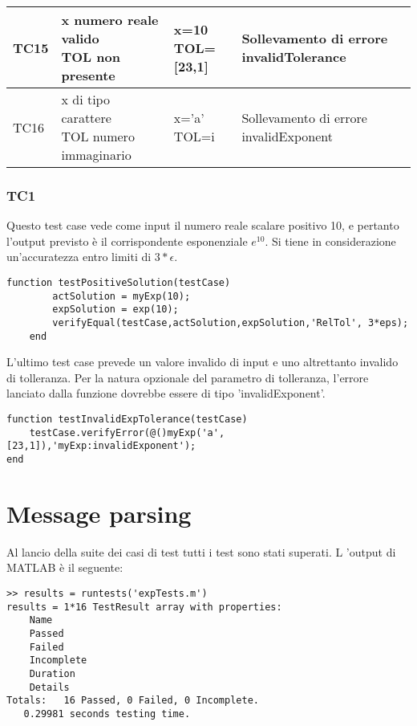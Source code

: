 \documentclass[a4paper,titlepage]{article}
\begin{document}
{{\begin{tabularx}{1.325\textwidth}{| l | l | l | l | }
				TC15 & \pbox{20cm}{\vspace{.5\baselineskip}x numero reale valido\\ TOL non presente \vspace{.5\baselineskip}}										& \pbox{20cm}{x=10\\ TOL=[23,1]} 	& Sollevamento di errore invalidTolerance\\ \hline
				TC16 & \pbox{20cm}{\vspace{.5\baselineskip}x di tipo carattere\\ TOL numero immaginario \vspace{.5\baselineskip}}									& \pbox{20cm}{x='a'\\ TOL=i} 	& Sollevamento di errore invalidExponent \\ \hline
				\end{tabularx}}
		}


\subsubsection{TC1}
Questo test case vede come input il numero reale scalare positivo 10, e pertanto l'output previsto è il corrispondente esponenziale $e^{10}$.
Si tiene in considerazione un'accuratezza entro limiti di $3*\epsilon$.
\begin{lstlisting}[caption=Test Case 1]
	function testPositiveSolution(testCase)
		actSolution = myExp(10);
		expSolution = exp(10);
		verifyEqual(testCase,actSolution,expSolution,'RelTol', 3*eps);
	end
\end{lstlisting}

L'ultimo test case prevede un valore invalido di input e uno altrettanto invalido di tolleranza.
Per la natura opzionale del parametro di tolleranza, l'errore lanciato dalla funzione dovrebbe essere di tipo 'invalidExponent'.
\begin{lstlisting}[caption=Test Case 16]
function testInvalidExpTolerance(testCase)
	testCase.verifyError(@()myExp('a',[23,1]),'myExp:invalidExponent');
end
\end{lstlisting}

\section{Message parsing}

Al lancio della suite dei casi di test tutti i test sono stati superati. L 'output di MATLAB è il seguente:
\begin{lstlisting}[caption=Risultati]
>> results = runtests('expTests.m')
results = 1*16 TestResult array with properties:
    Name
    Passed
    Failed
    Incomplete
    Duration
    Details
Totals:   16 Passed, 0 Failed, 0 Incomplete.
   0.29981 seconds testing time.
\end{lstlisting}
\end{document}
